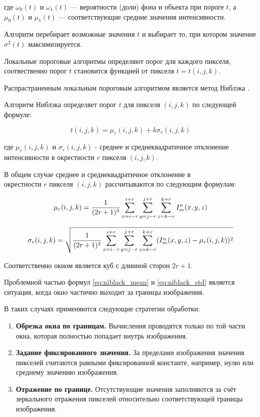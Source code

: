 где \(\omega_0(t)\) и \(\omega_1(t)\) — вероятности (доли) фона и объекта при пороге \(t\), а \(\mu_0(t)\) и \(\mu_1(t)\) — соответствующие средние значения интенсивности.

Алгоритм перебирает возможные значения \(t\) и выбирает то, при котором значение \(\sigma^2(t)\) максимизируется. 

Локальные пороговые алгоритмы определяют порог для каждого пикселя, соотвественно порог \(t\) становится функцией от пикселя \(t = t(i, j, k)\).

Распрастраненным локальным пороговым алгоритмом является метод Ниблэка \cite{niblack1985introduction}.

Алгоритм Ниблэка определяет порог \(t\) для пикселя \((i, j, k)\) по следующей формуле:

\begin{equation} \label{eq:niblack}
    t(i, j, k) = \mu_r(i, j, k) + k \sigma_r(i, j, k)
\end{equation}

где \(\mu_r(i, j, k)\) и \(\sigma_r(i, j, k)\) - среднее и среднеквадратичное отклонение интенсивности в окрестности \(r\) пикселя \((i, j, k)\).

В общем случае среднее и среднеквадратичное отклонение в \\ окрестности \(r\) пикселя \((i, j, k)\) рассчитываются по следующим формулам:

\begin{equation}\label{eq:niblack_mean}
    \mu_r(i, j, k) = \frac{1}{(2r + 1)^3} \sum_{x = i - r}^{i + r} \sum_{y = j - r}^{j + r} \sum_{z = k - r}^{k + r} I^n_m(x, y, z)
\end{equation}

\begin{equation}\label{eq:niblack_std}
    \sigma_r(i, j, k) = \sqrt{\frac{1}{(2r + 1)^3} \sum_{x = i - r}^{i + r} \sum_{y = j - r}^{j + r} \sum_{z = k - r}^{k + r} (I^n_m(x, y, z) - \mu_r(i, j, k))^2}
\end{equation}

Соответственно окном является куб с длинной сторон \(2r + 1\). 

Проблемной частью формул \ref{eq:niblack_mean} и \ref{eq:niblack_std} является ситуация, когда окно частично выходит за границы изображения.

В таких случаях применяются следующие стратегии обработки:

\begin{enumerate}
    \item \textbf{Обрезка окна по границам.} Вычисления проводятся только по той части окна, которая полностью попадает внутрь изображения.
    
    \item \textbf{Задание фиксированного значения.} За пределами изображения значения пикселей считаются равными фиксированной константе, например, нулю или среднему значению изображения.
    
    \item \textbf{Отражение по границе.} Отсутствующие значения заполняются за счёт зеркального отражения пикселей относительно соответствующей границы изображения.
\end{enumerate}

